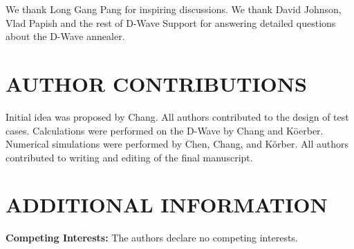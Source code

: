 \documentclass[prd,twocolumn,tightenlines,preprintnumbers,showpacs,superscriptaddress,notitlepage,nofootinbib,eqsecnum,floatfix,longbibliography,aps,10pt]{revtex4-2}
\begin{document}

We thank Long Gang Pang for inspiring discussions.
We thank David Johnson, Vlad Papish and the rest of D-Wave Support for answering detailed questions about the D-Wave annealer.

\section{AUTHOR CONTRIBUTIONS}

Initial idea was proposed by Chang.
All authors contributed to the design of test cases.
Calculations were performed on the D-Wave by Chang and K\"oerber.
Numerical simulations were performed by Chen, Chang, and K\"orber.
All authors contributed to writing and editing of the final manuscript.

\section{ADDITIONAL INFORMATION}

\textbf{Competing Interests:} The authors declare no competing interests.



\end{document}
